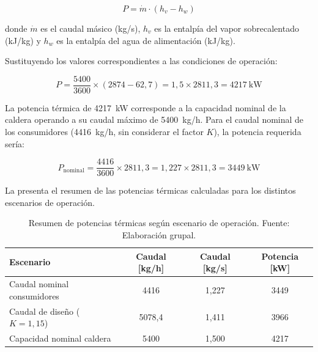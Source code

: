 \documentclass[12pt]{article}
\begin{document}
\begin{equation}
	P = \dot{m} \cdot (h_v - h_w)
	\label{eq:potencia-termica-caldera}
\end{equation}

\noindent donde $\dot{m}$ es el caudal másico (kg/s), $h_v$ es la entalpía del vapor sobrecalentado (kJ/kg) y $h_w$ es la entalpía del agua de alimentación (kJ/kg).

Sustituyendo los valores correspondientes a las condiciones de operación:

\begin{equation}
	P = \frac{5400}{3600} \times (2874 - 62{,}7) = 1{,}5 \times 2811{,}3 = 4217 \ \text{kW}
	\label{eq:potencia-caldera-calculada}
\end{equation}

La potencia térmica de 4217~kW corresponde a la capacidad nominal de la caldera operando a su caudal máximo de 5400~kg/h. Para el caudal nominal de los consumidores (4416~kg/h, sin considerar el factor $K$), la potencia requerida sería:

\begin{equation}
	P_{\text{nominal}} = \frac{4416}{3600} \times 2811{,}3 = 1{,}227 \times 2811{,}3 = 3449 \ \text{kW}
	\label{eq:potencia-nominal-consumidores}
\end{equation}

La  presenta el resumen de las potencias térmicas calculadas para los distintos escenarios de operación.

\begin{table}[H]
	\centering
	\caption{Resumen de potencias térmicas según escenario de operación. Fuente: Elaboración grupal.}
	\label{tab:resumen-potencias-caldera}
	\begin{tabular}{lccc}
		\toprule
		\textbf{Escenario}            & \textbf{Caudal [kg/h]} & \textbf{Caudal [kg/s]} & \textbf{Potencia [kW]} \\
		\midrule
		Caudal nominal consumidores   & 4416                   & 1,227                  & 3449                   \\
		Caudal de diseño ($K=1{,}15$) & 5078,4                 & 1,411                  & 3966                   \\
		Capacidad nominal caldera     & 5400                   & 1,500                  & 4217                   \\
		\bottomrule
	\end{tabular}
\end{table}
\end{document}
